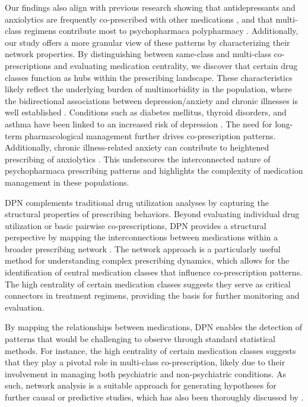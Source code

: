 \documentclass[
  authoryear,
  review]{elsarticle}
\begin{document}
Our findings also align with previous research showing that
antidepressants and anxiolytics are frequently co-prescribed with other
medications \citep{Shrivastava2013}, and that multi-class regimens
contribute most to psychopharmaca polypharmacy
\citep{de2004polypharmacy}. Additionally, our study offers a more
granular view of these patterns by characterizing their network
properties. By distinguishing between same-class and multi-class
co-prescriptions and evaluating medication centrality, we discover that
certain drug classes function as hubs within the prescribing landscape.
These characteristics likely reflect the underlying burden of
multimorbidity in the population, where the bidirectional associations
between depression/anxiety and chronic illnesses is well established
\citep{qi2024longitudinal}. Conditions such as diabetes mellitus,
thyroid disorders, and asthma have been linked to an increased risk of
depression \citep{jang2024temporal}. The need for long-term
pharmacological management further drives co-prescription patterns.
Additionally, chronic illness-related anxiety can contribute to
heightened prescribing of anxiolytics \citep{lebel2020health}. This
underscores the interconnected nature of psychopharmaca prescribing
patterns and highlights the complexity of medication management in these
populations.

DPN complements traditional drug utilization analyses by capturing the
structural properties of prescribing behaviors. Beyond evaluating
individual drug utilization or basic pairwise co-prescriptions, DPN
provides a structural perspective by mapping the interconnections
between medications within a broader prescribing network
\citep{Bazzoni2015}. The network approach is a particularly useful
method for understanding complex prescribing dynamics, which allows for
the identification of central medication classes that influence
co-prescription patterns. The high centrality of certain medication
classes suggests they serve as critical connectors in treatment
regimens, providing the basis for further monitoring and evaluation.

By mapping the relationships between medications, DPN enables the
detection of patterns that would be challenging to observe through
standard statistical methods. For instance, the high centrality of
certain medication classes suggests that they play a pivotal role in
multi-class co-prescription, likely due to their involvement in managing
both psychiatric and non-psychiatric conditions. As such, network
analysis is a suitable approach for generating hypotheses for further
causal or predictive studies, which has also been thoroughly discussed
by \citet{Askar2021}.
\end{document}
